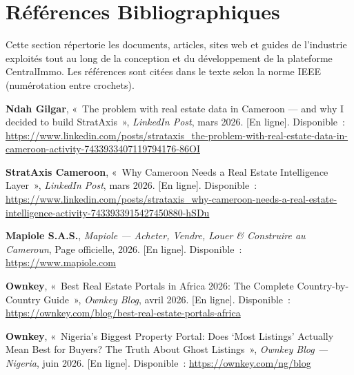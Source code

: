 
\chapter*{Références Bibliographiques}

Cette section répertorie les documents, articles, sites web et guides de l'industrie exploités tout au long de la conception et du développement de la plateforme CentralImmo. Les références sont citées dans le texte selon la norme IEEE (numérotation entre crochets).

\bigskip

\begin{enumerate}[label={[\arabic*]}, leftmargin=1.2cm, labelsep=0.3cm, itemsep=0.8em]

    \item \label{ref:ndah} \textbf{Ndah Gilgar}, «~The problem with real estate data in Cameroon --- and why I decided to build StratAxis~», \textit{LinkedIn Post}, mars 2026. [En ligne]. Disponible~: \url{https://www.linkedin.com/posts/strataxis_the-problem-with-real-estate-data-in-cameroon-activity-7433933407119794176-86OI}

    \item \label{ref:strataxis} \textbf{StratAxis Cameroon}, «~Why Cameroon Needs a Real Estate Intelligence Layer~», \textit{LinkedIn Post}, mars 2026. [En ligne]. Disponible~: \url{https://www.linkedin.com/posts/strataxis_why-cameroon-needs-a-real-estate-intelligence-activity-7433933915427450880-hSDu}

    \item \label{ref:mapiole_app} \textbf{Mapiole S.A.S.}, \textit{Mapiole --- Acheter, Vendre, Louer \& Construire au Cameroun}, Page officielle, 2026. [En ligne]. Disponible~: \url{https://www.mapiole.com}

    \item \label{ref:ownkey_portals} \textbf{Ownkey}, «~Best Real Estate Portals in Africa 2026: The Complete Country-by-Country Guide~», \textit{Ownkey Blog}, avril 2026. [En ligne]. Disponible~: \url{https://ownkey.com/blog/best-real-estate-portals-africa}

    \item \label{ref:ownkey_nigeria} \textbf{Ownkey}, «~Nigeria's Biggest Property Portal: Does `Most Listings' Actually Mean Best for Buyers? The Truth About Ghost Listings~», \textit{Ownkey Blog --- Nigeria}, juin 2026. [En ligne]. Disponible~: \url{https://ownkey.com/ng/blog}


\end{enumerate}
